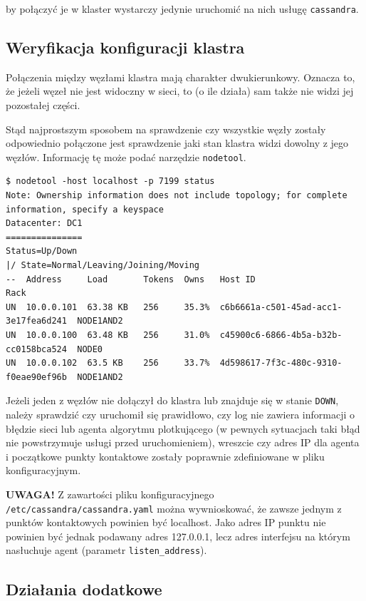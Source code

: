 \documentclass{article} %
\begin{document}
by połączyć je w klaster wystarczy jedynie uruchomić na nich usługę \texttt{cassandra}.

\subsection{Weryfikacja konfiguracji klastra}\label{subsec:cluster_verifying}

Połączenia między węzłami klastra mają charakter dwukierunkowy.
Oznacza to, że jeżeli węzeł nie jest widoczny w sieci, to (o ile działa) sam także nie widzi jej pozostałej części.

Stąd najprostszym sposobem na sprawdzenie czy wszystkie węzły zostały odpowiednio połączone jest sprawdzenie jaki stan klastra widzi dowolny z jego węzłów. Informację tę może podać narzędzie \texttt{nodetool}.

\begin{lstlisting}[style=bash, caption={sprawdzanie stanu klastra po dołączeniu węzłów}]
$ nodetool -host localhost -p 7199 status
Note: Ownership information does not include topology; for complete information, specify a keyspace
Datacenter: DC1
===============
Status=Up/Down
|/ State=Normal/Leaving/Joining/Moving
--  Address     Load       Tokens  Owns   Host ID                               Rack
UN  10.0.0.101  63.38 KB   256     35.3%  c6b6661a-c501-45ad-acc1-3e17fea6d241  NODE1AND2
UN  10.0.0.100  63.48 KB   256     31.0%  c45900c6-6866-4b5a-b32b-cc0158bca524  NODE0
UN  10.0.0.102  63.5 KB    256     33.7%  4d598617-7f3c-480c-9310-f0eae90ef96b  NODE1AND2
\end{lstlisting}

Jeżeli jeden z węzłów nie dołączył do klastra lub znajduje się w stanie \texttt{DOWN}, należy sprawdzić czy uruchomił się prawidłowo, czy log nie zawiera informacji o błędzie sieci lub agenta algorytmu plotkującego (w pewnych sytuacjach taki błąd nie powstrzymuje usługi przed uruchomieniem), wreszcie czy adres IP dla agenta i początkowe punkty kontaktowe zostały poprawnie zdefiniowane w pliku konfiguracyjnym.

\bigskip

\noindent\textbf{UWAGA!} Z zawartości pliku konfiguracyjnego \texttt{/etc/cassandra/cassandra.yaml} można wywnioskować, że zawsze jednym z punktów kontaktowych powinien być localhost.
Jako adres IP punktu nie powinien być jednak podawany adres 127.0.0.1, lecz adres interfejsu na którym nasłuchuje agent (parametr \texttt{listen\_address}).

\subsection{Działania dodatkowe}\label{subsec:cluster_misc}
\end{document}
